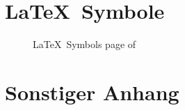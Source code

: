 \chapter{\LaTeX\ Symbole} \label{chap:LaTeX Symbole}

\def\MyAppendedPDF{latex_symbols.pdf} %
\setcounter{pages_of_my_pdf}{4} %
{
  \begin{figure}[htpb]
    \centering
    \caption{\LaTeX\ Symbols page  of }
    \label{fig:LaTeX Symbols page \arabic{current_page_of_my_pdf}}
  \end{figure}
} 

\chapter{Sonstiger Anhang} \label{chap:Sonstiger Anhang}
\blindtext